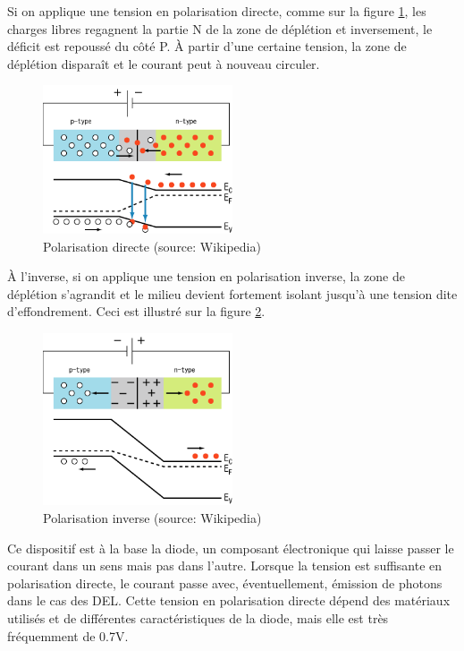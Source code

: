 \documentclass[a4paper,11pt]{book}
\theoremstyle{definition}
\begin{document}
Si on applique une tension en polarisation directe, comme sur la figure \ref{fig:forward}, les charges libres regagnent la partie N de la zone de déplétion et inversement, le déficit est repoussé du côté P. À partir d'une certaine tension, la zone de déplétion disparaît et le courant peut à nouveau circuler.

\begin{figure}[h]
\centering
\includegraphics[width=0.5\textwidth]{media/Semicon/PnJunction-Diode-ForwardBias.png}
\caption{Polarisation directe (source: Wikipedia)}
\label{fig:forward}
\end{figure}

À l'inverse, si on applique une tension en polarisation inverse, la zone de déplétion s'agrandit et le milieu devient fortement isolant jusqu'à une tension dite d'effondrement. Ceci est illustré sur la figure \ref{fig:reverse}.

\begin{figure}[h]
\centering
\includegraphics[width=0.5\textwidth]{media/Semicon/PnJunction-Diode-ReverseBias.png}
\caption{Polarisation inverse (source: Wikipedia)}
\label{fig:reverse}
\end{figure}

Ce dispositif est à la base la diode, un composant électronique qui laisse passer le courant dans un sens mais pas dans l'autre. Lorsque la tension est suffisante en polarisation directe, le courant passe avec, éventuellement, émission de photons dans le cas des DEL. Cette tension en polarisation directe dépend des matériaux utilisés et de différentes caractéristiques de la diode, mais elle est très fréquemment de 0.7V.
\end{document}
